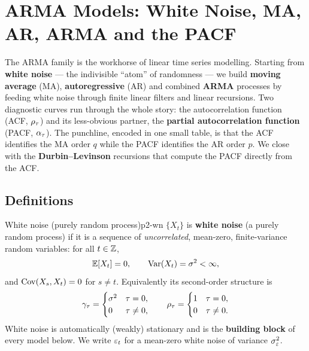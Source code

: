 \section{ARMA Models: White Noise, MA, AR, ARMA and the PACF}
\label{sec:arma}

The ARMA family is the workhorse of linear time series modelling. Starting from
\textbf{white noise} --- the indivisible ``atom'' of randomness --- we build
\textbf{moving average} (MA), \textbf{autoregressive} (AR) and combined
\textbf{ARMA} processes by feeding white noise through finite linear filters and
linear recursions. Two diagnostic curves run through the whole story: the
autocorrelation function (ACF, $\rho_\tau$) and its less-obvious partner, the
\textbf{partial autocorrelation function} (PACF, $\alpha_\tau$). The punchline,
encoded in one small table, is that the ACF identifies the MA order $q$ while
the PACF identifies the AR order $p$. We close with the
\textbf{Durbin--Levinson} recursions that compute the PACF directly from the
ACF.

\subsection{Definitions}

\begin{definition}{White noise (purely random process)}{p2-wn}
$\{X_t\}$ is \textbf{white noise} (a purely random process) if it is a sequence
of \emph{uncorrelated}, mean-zero, finite-variance random variables: for all
$t\in\mathbb{Z}$,
\[
\mathbb{E}[X_t]=0,\qquad \operatorname{Var}(X_t)=\sigma^2<\infty,
\]
and $\operatorname{Cov}(X_s,X_t)=0$ for $s\ne t$. Equivalently its second-order structure is
\[
\gamma_\tau=\begin{cases}\sigma^2 & \tau=0,\\ 0 & \tau\ne0,\end{cases}
\qquad
\rho_\tau=\begin{cases}1 & \tau=0,\\ 0 & \tau\ne0.\end{cases}
\]
White noise is automatically (weakly) stationary and is the \textbf{building
block} of every model below. We write $\varepsilon_t$ for a mean-zero white noise of
variance $\sigma^2_\varepsilon$.
\end{definition}

